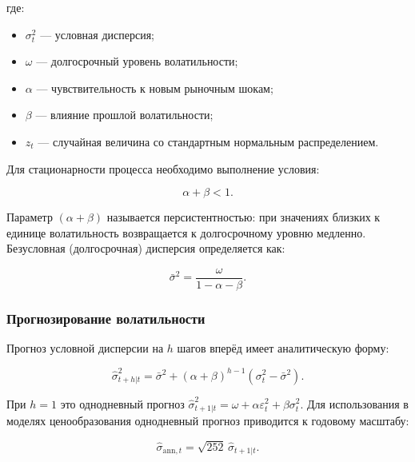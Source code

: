 \documentclass[11pt,a4paper]{article}
\begin{document}
где:
\begin{itemize}
    \item $\sigma_t^2$ --- условная дисперсия;
    
    \item $\omega$ --- долгосрочный уровень волатильности;
    
    \item $\alpha$ --- чувствительность к новым рыночным шокам;
    
    \item $\beta$ --- влияние прошлой волатильности;
    
    \item $z_t$ --- случайная величина со стандартным нормальным распределением.
\end{itemize}

Для стационарности процесса необходимо выполнение условия:

\begin{equation}
\alpha + \beta < 1.
\end{equation}

Параметр $(\alpha+\beta)$ называется персистентностью: при значениях близких к единице волатильность возвращается к долгосрочному уровню медленно. Безусловная (долгосрочная) дисперсия определяется как:

\begin{equation}
\bar{\sigma}^2 = \frac{\omega}{1 - \alpha - \beta}.
\end{equation}

\subsubsection{Прогнозирование волатильности}

Прогноз условной дисперсии на $h$ шагов вперёд имеет аналитическую форму:

\begin{equation}
\hat{\sigma}^2_{t+h|t} = \bar{\sigma}^2 + (\alpha + \beta)^{h-1}\!\left(\sigma^2_t - \bar{\sigma}^2\right).
\end{equation}

При $h=1$ это однодневный прогноз $\hat{\sigma}^2_{t+1|t} = \omega + \alpha\varepsilon_t^2 + \beta\sigma_t^2$. Для использования в моделях ценообразования однодневный прогноз приводится к годовому масштабу:

\begin{equation}
\hat{\sigma}_{\text{ann},t} = \sqrt{252}\,\hat{\sigma}_{t+1|t}.
\end{equation}
\end{document}
